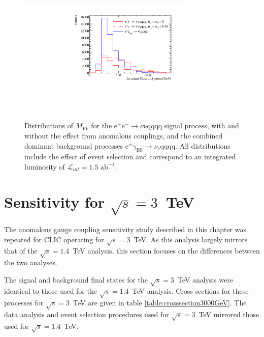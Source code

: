 \begin{figure}[h!]
\centering
\includegraphics[width=0.75\textwidth]{PhysicsAnalysis/Plots/NuisanceFit/1400GeV/NuisanceExplanation.pdf}
\caption[Distributions of $M_{VV}$ for the $\text{e}^{+}\text{e}^{-} \rightarrow \nu{\nu}\text{qqqq}$ signal process, with and without the effect from anomalous couplings, and the combined dominant background processes $\text{e}^{\pm}\gamma_{\text{BS}} \rightarrow \nu_{\text{e}}\text{qqqq}$.  All distributions include the effect of event selection and correspond to an integrated luminosity of $\mathcal{L}_{int} = 1.5\text{ ab}^{-1}$.]{Distributions of $M_{VV}$ for the $\text{e}^{+}\text{e}^{-} \rightarrow \nu{\nu}\text{qqqq}$ signal process, with and without the effect from anomalous couplings, and the combined dominant background processes $\text{e}^{\pm}\gamma_{\text{BS}} \rightarrow \nu_{\text{e}}\text{qqqq}$.  All distributions include the effect of event selection and correspond to an integrated luminosity of $\mathcal{L}_{int} = 1.5\text{ ab}^{-1}$.}
\label{fig:nuisanceexplanation1400GeV}
\end{figure}


\section{Sensitivity for $\sqrt{s}=3$~TeV}
The anomalous gauge coupling sensitivity study described in this chapter was repeated for CLIC operating for $\sqrt{s}=3$~TeV.  As this analysis largely mirrors that of the $\sqrt{s}=1.4$~TeV analysis, this section focuses on the differences between the two analyses.  

The signal and background final states for the $\sqrt{s}=3$~TeV analysis were identical to those used for the $\sqrt{s}=1.4$~TeV analysis.  Cross sections for these processes for $\sqrt{s}=3$~TeV are given in table \ref{table:crosssection3000GeV}.  The data analysis and event selection procedures used for $\sqrt{s}=3$~TeV mirrored those used for $\sqrt{s}=1.4$~TeV.  

